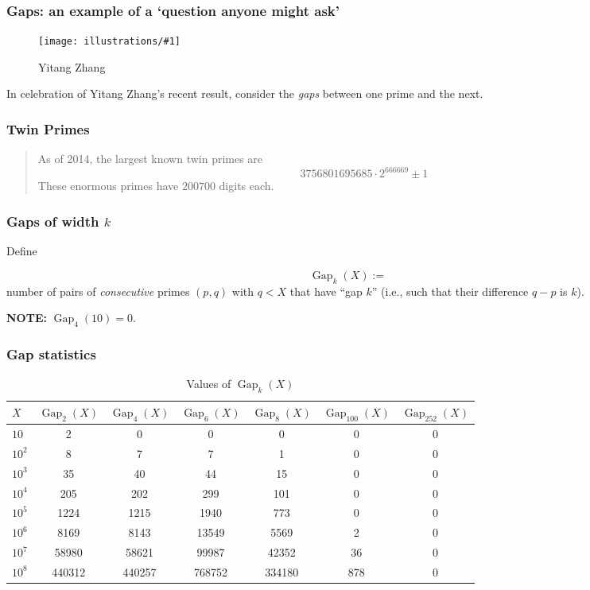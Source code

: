 \documentclass{beamer}
\DeclareMathOperator{\Gap}{Gap}
\newcommand{\ill}[3]{%
   \begin{figure}[H]%
   \vspace{-2ex}
   \centering%
   \texttt{[image: illustrations/\#1]}%
   \caption{#3}%
   \vspace{-2ex}
    \end{figure}}
\begin{document}
\begin{frame}\frametitle{\bf Gaps: an example of a `question anyone might ask'}
\vskip10pt

\ill{zhang}{0.15}{Yitang Zhang\label{fig:zhang}}

{\Huge
In celebration of Yitang Zhang's recent result, consider the {\em gaps} between one prime and the next.}
\end{frame}\begin{frame}\frametitle{\bf Twin Primes}
{\Huge
\begin{quote} As of 2014, the largest known twin primes are  \vskip10pt
$$3756801695685\cdot 2^{666669} \pm 1$$ \vskip10pt
These enormous primes have $200700$ digits each.
\end{quote}}
\end{frame}
\begin{frame}\frametitle{\bf Gaps of width $k$}
Define
{\Huge $$
  \Gap_{k}(X):=
$$
number of pairs of {\em consecutive} primes $(p,q)$ with
$q<X$ that have ``gap $k$'' (i.e., such that their difference $q-p$ is
$k$).

\vskip20pt

{\bf NOTE:} $\Gap_{4}(10)=0$.}\end{frame}
\begin{frame}\frametitle{\bf Gap statistics}


\begin{table}[H]\centering
\caption{Values of $\Gap_{k}(X)$ \label{tab:gap}}
\vspace{1em}

{\small
\begin{tabular}{|l|c|c|c|c|c|c|}\hline
$X$ & $\Gap_{2}(X)$ & $\Gap_{4}(X)$& $\Gap_{6}(X)$ & $\Gap_{8}(X)$ &
 $\Gap_{100}(X)$ &   $\Gap_{252}(X)$\\\hline

$10$ & 2 & 0 & 0 & 0 & 0 & 0\\\hline
$10^{2}$ & 8 & 7 & 7 & 1 & 0 & 0\\\hline
$10^{3}$ & 35 & 40 & 44 & 15 & 0 & 0\\\hline
$10^{4}$ & 205 & 202 & 299 & 101 & 0 & 0\\\hline
$10^{5}$ & 1224 & 1215 & 1940 & 773 & 0 & 0\\\hline
$10^{6}$ & 8169 & 8143 & 13549 & 5569 & 2 & 0\\\hline
$10^{7}$ & 58980 & 58621 & 99987 & 42352 & 36 & 0\\\hline
$10^{8}$ & 440312 & 440257 & 768752 & 334180 & 878 & 0\\\hline

\end{tabular}
}
\end{table}
\end{frame}
\end{document}
